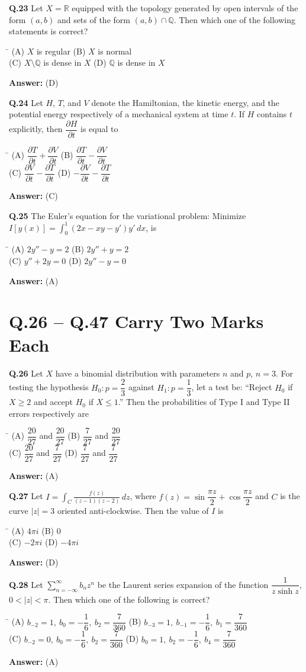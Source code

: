 \documentclass[11pt,a4paper]{article}
\newcommand{\optsfourA}[4]{%
  \begin{tabbing}
    \hspace{0.48\linewidth}\=\kill
    (A) #1 \> (B) #2 \\[2pt]
    (C) #3 \> (D) #4
  \end{tabbing}%
}
\newcommand{\ans}[1]{\textbf{Answer:} #1\par\medskip}
\begin{document}
\textbf{Q.23} Let $X = \mathbb{R}$ equipped with the topology generated by open intervals of the form $(a, b)$ and sets of the form $(a, b) \cap \mathbb{Q}$. Then which one of the following statements is correct?
\optsfourA{$X$ is regular}{$X$ is normal}{$X \setminus \mathbb{Q}$ is dense in $X$}{$\mathbb{Q}$ is dense in $X$}
\ans{(D)}

\textbf{Q.24} Let $H$, $T$, and $V$ denote the Hamiltonian, the kinetic energy, and the potential energy respectively of a mechanical system at time $t$. If $H$ contains $t$ explicitly, then $\dfrac{\partial H}{\partial t}$ is equal to
\optsfourA{$\dfrac{\partial T}{\partial t} + \dfrac{\partial V}{\partial t}$}{$\dfrac{\partial T}{\partial t} - \dfrac{\partial V}{\partial t}$}{$\dfrac{\partial V}{\partial t} - \dfrac{\partial T}{\partial t}$}{$-\dfrac{\partial V}{\partial t} - \dfrac{\partial T}{\partial t}$}
\ans{(C)}

\textbf{Q.25} The Euler's equation for the variational problem: Minimize $I[y(x)] = \displaystyle\int_0^1 (2x - xy - y')y'\,dx$, is
\optsfourA{$2y'' - y = 2$}{$2y'' + y = 2$}{$y'' + 2y = 0$}{$2y'' - y = 0$}
\ans{(A)}

\section*{Q.26 -- Q.47 Carry Two Marks Each}

\textbf{Q.26} Let $X$ have a binomial distribution with parameters $n$ and $p$, $n = 3$. For testing the hypothesis $H_0 : p = \dfrac{2}{3}$ against $H_1 : p = \dfrac{1}{3}$, let a test be: ``Reject $H_0$ if $X \ge 2$ and accept $H_0$ if $X \le 1$.'' Then the probabilities of Type I and Type II errors respectively are
\optsfourA{$\dfrac{20}{27}$ and $\dfrac{20}{27}$}{$\dfrac{7}{27}$ and $\dfrac{20}{27}$}{$\dfrac{20}{27}$ and $\dfrac{7}{27}$}{$\dfrac{7}{27}$ and $\dfrac{7}{27}$}
\ans{(A)}

\textbf{Q.27} Let $I = \displaystyle\int_C \frac{f(z)}{(z - 1)(z - 2)}\,dz$, where $f(z) = \sin\dfrac{\pi z}{2} + \cos\dfrac{\pi z}{2}$ and $C$ is the curve $|z| = 3$ oriented anti-clockwise. Then the value of $I$ is
\optsfourA{$4\pi i$}{$0$}{$-2\pi i$}{$-4\pi i$}
\ans{(D)}

\textbf{Q.28} Let $\displaystyle\sum_{n=-\infty}^{\infty} b_n z^n$ be the Laurent series expansion of the function $\dfrac{1}{z\sinh z}$, $0 < |z| < \pi$. Then which one of the following is correct?
\optsfourA{$b_{-2} = 1,\ b_0 = -\dfrac{1}{6},\ b_2 = \dfrac{7}{360}$}{$b_{-3} = 1,\ b_{-1} = -\dfrac{1}{6},\ b_1 = \dfrac{7}{360}$}{$b_{-2} = 0,\ b_0 = -\dfrac{1}{6},\ b_2 = \dfrac{7}{360}$}{$b_0 = 1,\ b_2 = -\dfrac{1}{6},\ b_4 = \dfrac{7}{360}$}
\ans{(A)}
\end{document}

